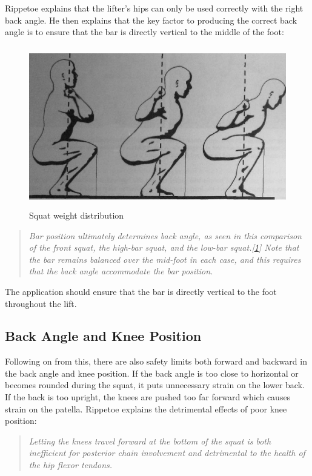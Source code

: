 Rippetoe explains that the lifter's hips can only be used correctly with the right back angle. He then explains that the key factor to producing the correct back angle is to ensure that the bar is directly vertical to the middle of the foot:

\begin{figure}[H]
    \centering
	\includegraphics[height=7cm]{squat/images/rippetoe_weight_distro}
\caption{Squat weight distribution}
\label{fig:ripptoe_weight}
\end{figure}

\begin{quote}
\emph{Bar position ultimately determines back angle, as seen in this comparison of the front squat, the high-bar squat, and the low-bar squat.[\ref{fig:ripptoe_weight}] Note that the bar remains balanced over the mid-foot in each case, and this requires that the back angle accommodate the bar position.}
\end{quote}

The application should ensure that the bar is directly vertical to the foot throughout the lift.

\subsection{Back Angle and Knee Position}

Following on from this, there are also safety limits both forward and backward in the back angle and knee position. If the back angle is too close to horizontal or becomes rounded during the squat, it puts unnecessary strain on the lower back. If the back is too upright, the knees are pushed too far forward which causes strain on the patella. Rippetoe explains the detrimental effects of poor knee position:

\begin{quote}
\emph{Letting the knees travel forward at the bottom of the squat is both inefficient for posterior chain involvement and detrimental to the health of the hip flexor tendons.}
\end{quote}

